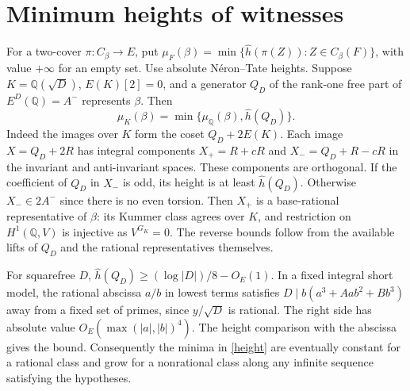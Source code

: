 \documentclass[11pt]{article}
\newcommand{\Q}{\mathbb Q}\newcommand{\F}{\mathbb F}\newcommand{\Z}{\mathbb Z}
\begin{document}
\section{Minimum heights of witnesses}
For a two-cover $\pi:C_\beta\to E$, put
$\mu_F(\beta)=\min\{\hat h(\pi(Z)):Z\in C_\beta(F)\}$, with value $+\infty$ for an empty set. Use absolute N\'eron--Tate heights. Suppose $K=\Q(\sqrt D)$, $E(K)[2]=0$, and a generator $Q_D$ of the rank-one free part of $E^D(\Q)=A^-$ represents $\beta$. Then
\begin{equation}\label{height}
 \mu_K(\beta)=\min\{\mu_{\Q}(\beta),\hat h(Q_D)\}.
\end{equation}
Indeed the images over $K$ form the coset $Q_D+2E(K)$. Each image $X=Q_D+2R$ has integral components
$X_+=R+cR$ and $X_-=Q_D+R-cR$ in the invariant and anti-invariant spaces. These components are orthogonal. If the coefficient of $Q_D$ in $X_-$ is odd, its height is at least $\hat h(Q_D)$. Otherwise $X_-\in 2A^-$ since there is no even torsion. Then $X_+$ is a base-rational representative of $\beta$: its Kummer class agrees over $K$, and restriction on $H^1(\Q,V)$ is injective as $V^{G_K}=0$. The reverse bounds follow from the available lifts of $Q_D$ and the rational representatives themselves.

For squarefree $D$, $\hat h(Q_D)\ge (\log |D|)/8-O_E(1)$. In a fixed integral short model, the rational abscissa $a/b$ in lowest terms satisfies $D\mid b(a^3+Aab^2+Bb^3)$ away from a fixed set of primes, since $y/\sqrt D$ is rational. The right side has absolute value $O_E(\max(|a|,|b|)^4)$. The height comparison with the abscissa gives the bound. Consequently the minima in \eqref{height} are eventually constant for a rational class and grow for a nonrational class along any infinite sequence satisfying the hypotheses.
\end{document}
